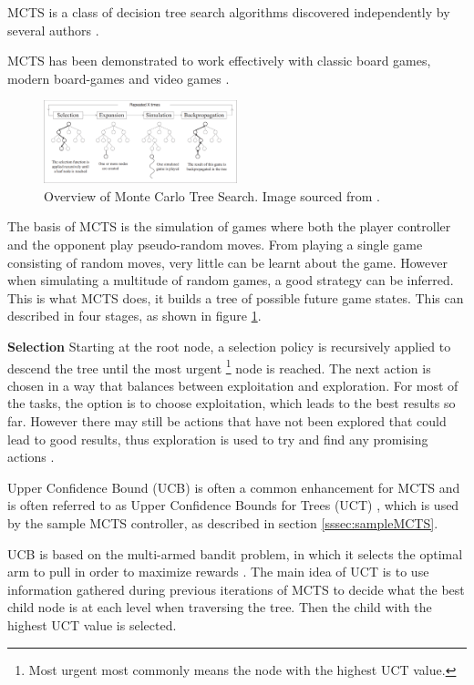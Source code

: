 \documentclass[journal]{IEEEtran}
\begin{document}
		MCTS is a class of decision tree search algorithms discovered independently by several authors \cite{coulom2006efficient, kocsis2006bandit, chaslot2006monte}.
		
		MCTS has been demonstrated to work effectively with classic board games, modern board-games and video games \cite{chaslot2008monte, pepels2014real}.

		\begin{figure}[h]
		    \centering
		    \includegraphics[width=0.5\textwidth]{MCTSProcess}
		    \caption{Overview of Monte Carlo Tree Search. Image sourced from \cite{chaslot2008monte}. }
		    \label{fig:MCTS1}
		\end{figure}
		

		The basis of MCTS is the simulation of games where both the player controller and the opponent play pseudo-random moves. From playing a single game consisting of random moves, very little can be learnt about the game. However when simulating a multitude of random games, a good strategy can be inferred. This is what MCTS does, it builds a tree of possible future game states. This can described in four stages, as shown in figure \ref{fig:MCTS1}.
		
		\textbf{Selection}
			Starting at the root node, a selection policy is recursively applied to descend the tree until the most urgent \footnote{Most urgent most commonly means the node with the highest UCT value.} node is reached. 
			The next action is chosen in a way that balances between exploitation and exploration. For most of the tasks, the option is to choose exploitation, which leads to the best results so far. However there may still be actions that have not been explored that could lead to good results, thus exploration is used to try and find any promising actions \cite{chaslot2008monte}.
			
			Upper Confidence Bound (UCB) is often a common enhancement for MCTS and is often referred to as Upper Confidence Bounds for Trees (UCT) \cite{bravi2017evolving}, which is used by the sample MCTS controller, as described in section \ref{sssec:sampleMCTS}. 

			UCB is based on the multi-armed bandit problem, in which it selects the optimal arm to pull in order to maximize rewards \cite{kocsis2006bandit, browne2012survey}.
			The main idea of UCT is to use information gathered during previous iterations of MCTS to decide what the best child node is at each level when traversing the tree. Then the child with the highest UCT value is selected. 
			
\end{document}
